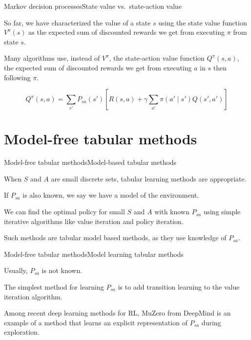 \documentclass{beamer}
\begin{document}
\begin{frame}{Markov decision processes}{State value vs.\ state-action value}

  So far, we have characterized the \alert{value} of a state $s$
  using the state value function $V^{\pi}(s)$ as the expected sum of
  discounted rewards we get from executing $\pi$ from state $s$.

  \medskip

  Many algorithms use, instead of $V^\pi$, the \alert{state-action}
  value function $Q^\pi(s,a)$, the expected sum of discounted rewards
  we get from executing $a$ in $s$ then following $\pi$.

  \medskip

  $$Q^\pi(s,a) = \sum_{s'}P_{sa}(s')\left[R(s,a) + \gamma\sum_{a'}\pi(a' \mid s')
         Q(s',a')\right]$$

\end{frame}

\section{Model-free tabular methods}

\begin{frame}{Model-free tabular methods}{Model-based tabular methods}

  When $S$ and $A$ are small discrete sets, \alert{tabular} learning
  methods are appropriate.

  \medskip

  If $P_{sa}$ is also known, we say we have a \alert{model} of the
  environment.

  \medskip

  We can find the optimal policy for small $S$ and $A$ with known
  $P_{sa}$ using simple iterative algorithms like \alert{value iteration}
  and \alert{policy iteration}.

  \medskip

  Such methods are \alert{tabular model based methods}, as they use 
  knowledge of $P_{sa}$.

\end{frame}


\begin{frame}{Model-free tabular methods}{Model learning tabular methods}

  Usually, $P_{sa}$ is not known.

  \medskip

  The simplest method for learning $P_{sa}$ is to add \alert{transition learning}
  to the value iteration algorithm. 

  \medskip

  Among recent deep learning methods for RL, MuZero from DeepMind is
  an example of a method that learns an explicit representation of $P_{sa}$
  during exploration.

\end{frame}
\end{document}
